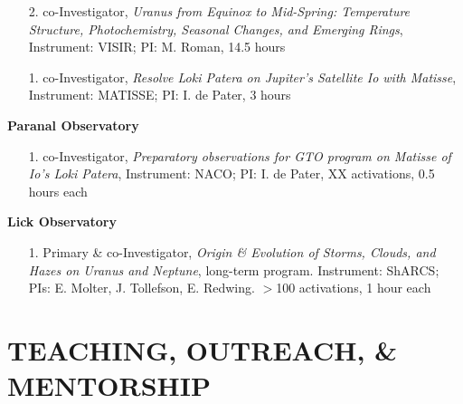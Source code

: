 \documentclass[margin, 10pt]{res} %
\begin{document}
\begin{resume}
\begin{enumerate}
	\item[2.] co-Investigator, {\it Uranus from Equinox to Mid-Spring: Temperature Structure, Photochemistry, Seasonal Changes, and Emerging Rings}, Instrument: VISIR; PI: M. Roman, 14.5 hours %
	\item[1.] co-Investigator, {\it Resolve Loki Patera on Jupiter’s Satellite Io with Matisse}, Instrument: MATISSE; PI: I. de Pater, 3 hours %
\end{enumerate}
\vspace{-0.3cm}
\textbf{Paranal Observatory}
\begin{enumerate}
	\item[1.] co-Investigator, {\it Preparatory observations for GTO program on Matisse of Io's Loki Patera}, Instrument: NACO; PI: I. de Pater, XX activations, 0.5 hours each %
\end{enumerate}
\vspace{-0.3cm}
\textbf{Lick Observatory} 
\begin{enumerate}
	\item[1.] Primary \& co-Investigator, {\it Origin \& Evolution of Storms, Clouds, and Hazes on Uranus and Neptune}, long-term program. Instrument: ShARCS; PIs: E. Molter, J. Tollefson, E. Redwing. $>$100 activations, 1 hour each %
\end{enumerate}




\section{TEACHING, OUTREACH, \& MENTORSHIP}


\end{resume}
\end{document}
